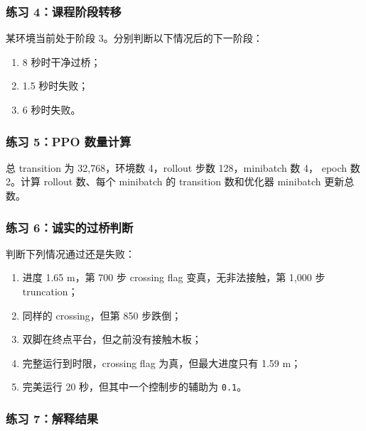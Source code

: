 \documentclass[
  chinese,
  11pt,
  letterpaper,
]{article}
\providecommand{\tightlist}{%
  \setlength{\itemsep}{0pt}\setlength{\parskip}{0pt}}
\begin{document}
\subsubsection{练习
4：课程阶段转移}\label{ux7ec3ux4e60-4ux8bfeux7a0bux9636ux6bb5ux8f6cux79fb}

某环境当前处于阶段 3。分别判断以下情况后的下一阶段：

\begin{enumerate}
\def\labelenumi{\arabic{enumi}.}
\tightlist
\item
  8 秒时干净过桥；
\item
  1.5 秒时失败；
\item
  6 秒时失败。
\end{enumerate}

\subsubsection{练习 5：PPO
数量计算}\label{ux7ec3ux4e60-5ppo-ux6570ux91cfux8ba1ux7b97}

总 transition 为 32,768，环境数 4，rollout 步数 128，minibatch 数 4，
epoch 数 2。计算 rollout 数、每个 minibatch 的 transition 数和优化器
minibatch 更新总数。

\subsubsection{练习
6：诚实的过桥判断}\label{ux7ec3ux4e60-6ux8bdaux5b9eux7684ux8fc7ux6865ux5224ux65ad}

判断下列情况通过还是失败：

\begin{enumerate}
\def\labelenumi{\arabic{enumi}.}
\tightlist
\item
  进度 1.65 m，第 700 步 crossing flag 变真，无非法接触，第 1,000 步
  truncation；
\item
  同样的 crossing，但第 850 步跌倒；
\item
  双脚在终点平台，但之前没有接触木板；
\item
  完整运行到时限，crossing flag 为真，但最大进度只有 1.59 m；
\item
  完美运行 20 秒，但其中一个控制步的辅助为 \texttt{0.1}。
\end{enumerate}

\subsubsection{练习
7：解释结果}\label{ux7ec3ux4e60-7ux89e3ux91caux7ed3ux679c}
\end{document}
